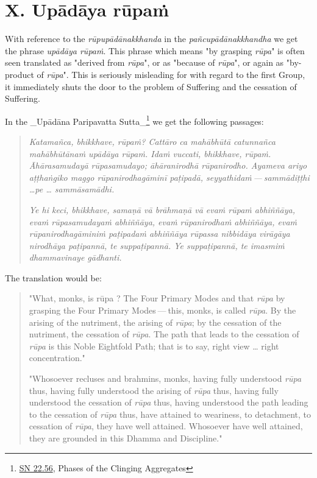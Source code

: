 \hypertarget{x-x.-upādāya-rūpaṁ}{\section*{X. Upādāya rūpaṁ}}
With reference to the \emph{rūpupādānakkhanda} in the \emph{pañcupādānakkhandha} we
get the phrase \emph{upādāya rūpaṁ}. This phrase which means "by grasping \emph{rūpa}"
is often seen translated as "derived from \emph{rūpa}", or as "because of
\emph{rūpa}", or again as "by-product of \emph{rūpa}". This is seriously misleading for
with regard to the first Group, it immediately shuts the door to the
problem of Suffering and the cessation of Suffering.


In the _Upādāna Paripavatta Sutta_\footnote{\href{https://suttacentral.net/sn22.56/en/bodhi}{SN 22.56}, Phases of the Clinging Aggregates} we get the following passages:


\begin{quotation}
\emph{Katamañca, bhikkhave, rūpaṁ? Cattāro ca mahābhūtā catunnañca mahābhūtānaṁ upādāya rūpaṁ. Idaṁ vuccati, bhikkhave, rūpaṁ. Āhārasamudayā rūpasamudayo; āhāranirodhā rūpanirodho. Ayameva ariyo aṭṭhaṅgiko maggo rūpanirodhagāminī paṭipadā, seyyathidaṁ — sammādiṭṭhi …​ pe …​ sammāsamādhi.}


\emph{Ye hi keci, bhikkhave, samaṇā vā brāhmaṇā vā evaṁ rūpaṁ abhiññāya, evaṁ rūpasamudayaṁ abhiññāya, evaṁ rūpanirodhaṁ abhiññāya, evaṁ rūpanirodhagāminiṁ paṭipadaṁ abhiññāya rūpassa nibbidāya virāgāya nirodhāya paṭipannā, te suppaṭipannā. Ye suppaṭipannā, te imasmiṁ dhammavinaye gādhanti.}


\end{quotation}

The translation would be:


\begin{quotation}
"What, monks, is rūpa ? The Four Primary Modes and that \emph{rūpa} by
grasping the Four Primary Modes — this, monks, is called \emph{rūpa}. By the
arising of the nutriment, the arising of \emph{rūpa}; by the cessation of the
nutriment, the cessation of \emph{rūpa}. The path that leads to the cessation
of \emph{rūpa} is this Noble Eightfold Path; that is to say, right view …​ right concentration."


"Whosoever recluses and brahmins, monks, having fully understood \emph{rūpa}
thus, having fully understood the arising of \emph{rūpa} thus, having fully
understood the cessation of \emph{rūpa} thus, having understood the path
leading to the cessation of \emph{rūpa} thus, have attained to weariness, to
detachment, to cessation of \emph{rūpa}, they have well attained. Whosoever have
well attained, they are grounded in this Dhamma and Discipline."


\end{quotation}

